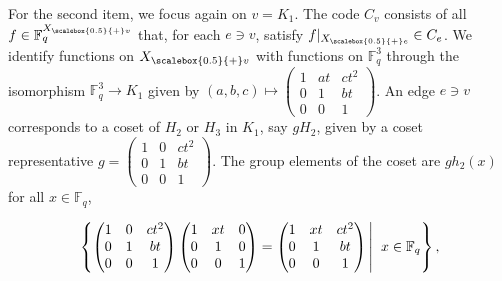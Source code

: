 \documentclass[10pt,a4paper]{article}
\begin{document}
For the second item, we focus again on $v=K_{1}$. The code $C_{v}$ consists of all $f\in\mathbb{F}_{q}^{{X}_{\scalebox{0.5}{+}v}}$ that, for each $e\ni v$, satisfy $f|_{{X}_{\scalebox{0.5}{+}e}}\in C_{e}$. We identify functions on ${X}_{\scalebox{0.5}{+}v}$ with functions on $\mathbb{F}_{q}^{3}$ through the isomorphism $\mathbb{F}_{q}^{3}\to K_{1}$ given by $(a,b,c)\mapsto\begin{pmatrix}1&at&ct^{2}\\
0&1&bt\\
0&0&1\end{pmatrix}$. An edge $e\ni v$ corresponds to a coset of $H_{2}$ or $H_{3}$ in $K_{1}$, say $gH_{2}$, given by a coset representative $g=\begin{pmatrix}1&0&ct^{2}\\
0&1&bt\\
0&0&1\end{pmatrix}$. The group elements of the coset are $gh_{2}(x)$ for all $x\in\mathbb{F}_{q}$,\par


\[\begin{gathered}
\displaystyle\left\{\begin{pmatrix}1&0&ct^{2}\\
0&1&bt\\
0&0&1\end{pmatrix}\begin{pmatrix}1&xt&0\\
0&1&0\\
0&0&1\end{pmatrix}=\begin{pmatrix}1&xt&ct^{2}\\
0&1&bt\\
0&0&1\end{pmatrix}\left|\;\vphantom{\begin{pmatrix}1&0&ct^{2}\\
0&1&bt\\
0&0&1\end{pmatrix}\begin{pmatrix}1&xt&0\\
0&1&0\\
0&0&1\end{pmatrix}=\begin{pmatrix}1&xt&ct^{2}\\
0&1&bt\\
0&0&1\end{pmatrix}x\in\mathbb{F}_{q}}\right.x\in\mathbb{F}_{q}\right\},
\end{gathered}\]
\end{document}
